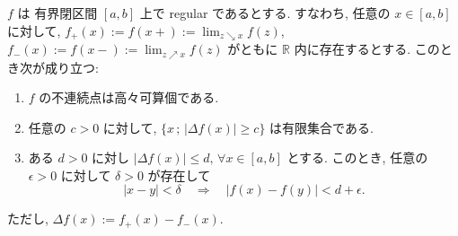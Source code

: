\documentclass{ltjsarticle}
\begin{document}
\begin{lem}[Regularity]
	\( f \) は 有界閉区間 \( [a,b] \) 上で regular であるとする.
	すなわち, 任意の \( x \in [a,b] \) に対して, 
	\( f_{+}( x ) := f( x + ) := \lim_{ z \searrow x } f( z ) \),
	\( f_{-}( x ) := f( x - ) := \lim_{ z \nearrow x } f( z ) \)
	がともに \( \mathbb{R} \) 内に存在するとする.
	このとき次が成り立つ:
	\begin{enumerate}
		\item \label{lem:item: regular function admits at most countable jumps}	\( f \) の不連続点は高々可算個である.
		      
		\item	\label{lem:item: regular function admits finite big jumps} 任意の \( c > 0 \) に対して,
		      \( \{ x \, ; \, | \Delta f(x) | \ge c \} \)
		      は有限集合である.
		      
		\item	\label{lem:item: epsilon-delta for regular function} ある \( d > 0 \) に対し \( | \Delta f(x) | \le d, \, \forall x \in [a,b] \) とする.
		      このとき, 任意の \( \epsilon > 0 \) に対して \( \delta > 0 \) が存在して
		      \[
			      | x - y | < \delta 
			      \quad \Rightarrow \quad
			      | f( x ) - f( y ) | < d + \epsilon.
		      \]
	\end{enumerate}
	ただし, \( \Delta f( x ) := f_{+}( x ) - f_{-}( x ) \).
\end{lem}
\end{document}

